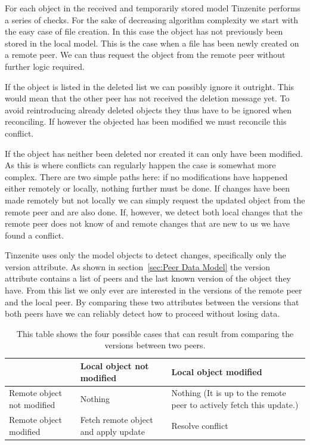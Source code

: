 For each object in the received and temporarily stored model Tinzenite performs a series of checks.
For the sake of decreasing algorithm complexity we start with the easy case of file creation.
In this case the object has not previously been stored in the local model.
This is the case when a file has been newly created on a remote peer.
We can thus request the object from the remote peer without further logic required.

If the object is listed in the deleted list we can possibly ignore it outright.
This would mean that the other peer has not received the deletion message yet.
To avoid reintroducing already deleted objects they thus have to be ignored when reconciling.
If however the objected has been modified we must reconcile this conflict.

If the object has neither been deleted nor created it can only have been modified.
As this is where conflicts can regularly happen the case is somewhat more complex.
There are two simple paths here: if no modifications have happened either remotely or locally, nothing further must be done.
If changes have been made remotely but not locally we can simply request the updated object from the remote peer and are also done.
If, however, we detect both local changes that the remote peer does not know of and remote changes that are new to us we have found a conflict.

Tinzenite uses only the model objects to detect changes, specifically only the version attribute.
As shown in section~\ref{sec:Peer Data Model} the version attribute contains a list of peers and the last known version of the object they have.
From this list we only ever are interested in the versions of the remote peer and the local peer.
By comparing these two attributes between the versions that both peers have we can reliably detect how to proceed without losing data.

\begin{table}[htp]
\centering
\begin{tabulary}{\textwidth}{J || J | J }
      & Local object not modified & Local object modified \\
    \hline \hline
    Remote object not modified & Nothing & Nothing (It is up to the remote peer to actively fetch this update.) \\
    \hline
    Remote object modified & Fetch remote object and apply update & Resolve conflict \\
\end{tabulary}
\caption[Peer Object Version States]{This table shows the four possible cases that can result from comparing the versions between two peers.}
\label{table:version_states_possible}
\end{table}

